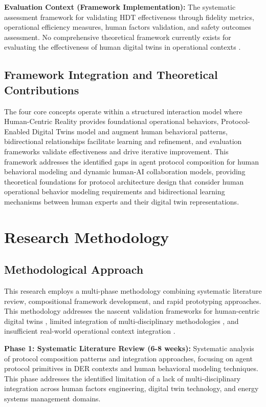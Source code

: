 \documentclass[12pt,a4paper]{article}
\begin{document}
\textbf{Evaluation Context (Framework Implementation):} The systematic assessment framework for validating HDT effectiveness through fidelity metrics, operational efficiency measures, human factors validation, and safety outcomes assessment. No comprehensive theoretical framework currently exists for evaluating the effectiveness of human digital twins in operational contexts \cite{10.1109/etfa61755.2024.10711109} \cite{10.1016/j.ifacol.2022.09.675}.

\subsection{Framework Integration and Theoretical Contributions}

The four core concepts operate within a structured interaction model where Human-Centric Reality provides foundational operational behaviors, Protocol-Enabled Digital Twins model and augment human behavioral patterns, bidirectional relationships facilitate learning and refinement, and evaluation frameworks validate effectiveness and drive iterative improvement. This framework addresses the identified gaps in agent protocol composition for human behavioral modeling and dynamic human-AI collaboration models, providing theoretical foundations for protocol architecture design that consider human operational behavior modeling requirements and bidirectional learning mechanisms between human experts and their digital twin representations.

\section{Research Methodology}
\label{sec:methodology}

\subsection{Methodological Approach}

This research employs a multi-phase methodology combining systematic literature review, compositional framework development, and rapid prototyping approaches. This methodology addresses the nascent validation frameworks for human-centric digital twins \cite{10.1109/etfa61755.2024.10711109}, limited integration of multi-disciplinary methodologies \cite{10.1016/j.ifacol.2022.09.675}, and insufficient real-world operational context integration \cite{10.1007/s10207-023-00784-x}.

\textbf{Phase 1: Systematic Literature Review (6-8 weeks):} Systematic analysis of protocol composition patterns and integration approaches, focusing on agent protocol primitives in DER contexts and human behavioral modeling techniques. This phase addresses the identified limitation of a lack of multi-disciplinary integration across human factors engineering, digital twin technology, and energy systems management domains.
\end{document}
